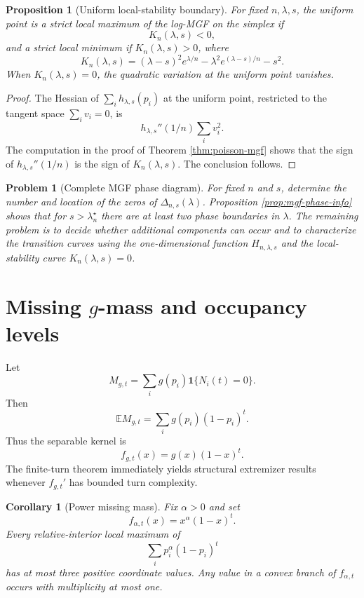 \documentclass[11pt]{article}
\newtheorem{proposition}[theorem]{Proposition}
\newtheorem{corollary}[theorem]{Corollary}
\newtheorem{problem}[theorem]{Problem}
\theoremstyle{definition}
\newcommand{\E}{\mathbb E}
\newcommand{\ones}{\mathbf 1}
\begin{document}
\begin{proposition}[Uniform local-stability boundary]\label{prop:mgf-spinodal}
For fixed $n,\lambda,s$, the uniform point is a strict local maximum of the log-MGF on the simplex if
\[
  K_{n}(\lambda,s)<0,
\]
and a strict local minimum if $K_n(\lambda,s)>0$, where
\[
  K_n(\lambda,s)
  =(\lambda-s)^2 e^{\lambda/n}-\lambda^2 e^{(\lambda-s)/n}-s^2.
\]
When $K_n(\lambda,s)=0$, the quadratic variation at the uniform point vanishes.
\end{proposition}

\begin{proof}
The Hessian of $\sum_i h_{\lambda,s}(p_i)$ at the uniform point, restricted to the tangent space $\sum_i v_i=0$, is
\[
  h_{\lambda,s}''(1/n)\sum_i v_i^2.
\]
The computation in the proof of Theorem \ref{thm:poisson-mgf} shows that the sign of $h_{\lambda,s}''(1/n)$ is the sign of $K_n(\lambda,s)$.  The conclusion follows.
\end{proof}

\begin{problem}[Complete MGF phase diagram]
For fixed $n$ and $s$, determine the number and location of the zeros of $\Delta_{n,s}(\lambda)$.  Proposition \ref{prop:mgf-phase-info} shows that for $s>\lambda_n^\star$ there are at least two phase boundaries in $\lambda$.  The remaining problem is to decide whether additional components can occur and to characterize the transition curves using the one-dimensional function $H_{n,\lambda,s}$ and the local-stability curve $K_n(\lambda,s)=0$.
\end{problem}

\section{\texorpdfstring{Missing $g$-mass and occupancy levels}{Missing g-mass and occupancy levels}}

Let
\[
  M_{g,t}=\sum_i g(p_i)\ones\{N_i(t)=0\}.
\]
Then
\[
  \E M_{g,t}=\sum_i g(p_i)(1-p_i)^t.
\]
Thus the separable kernel is
\[
  f_{g,t}(x)=g(x)(1-x)^t.
\]
The finite-turn theorem immediately yields structural extremizer results whenever $f_{g,t}'$ has bounded turn complexity.

\begin{corollary}[Power missing mass]\label{cor:power-g}
Fix $\alpha>0$ and set
\[
  f_{\alpha,t}(x)=x^\alpha(1-x)^t.
\]
Every relative-interior local maximum of
\[
  \sum_i p_i^\alpha(1-p_i)^t
\]
has at most three positive coordinate values. Any value in a convex branch of $f_{\alpha,t}$ occurs with multiplicity at most one.
\end{corollary}
\end{document}

